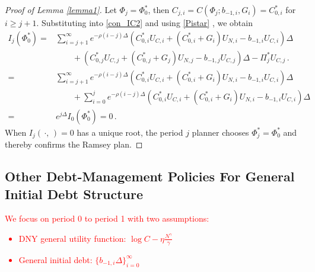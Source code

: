 \documentclass[12pt]{article}
\newcommand{\WJ}[1]{{\textcolor{red}{#1}}}
\begin{document}
\begin{proof}[Proof of Lemma \ref{lemma1}]
Let  $\Phi_j = \Phi_0^*$,  then $C_{j, i}=C(\Phi_j; b_{-1, i}, G_{i})=C_{0, i}^*$ for $i\geq j+1$. Substituting into \eqref{con_IC2} and using \eqref{Pistar} , we obtain
\begin{align*}
I_j(\Phi_0^*) 
=&   \sum_{i=j+1}^{\infty} e^{-\rho(i-j) \Delta} \left(  C_{0, i}^*U_{C, i} + (C_{0, i}^*+G_{i})U_{N, i} -b_{-1, i} U_{C, i} \right) \Delta \nonumber \\
& \quad\quad + \left (C_{0, j}^*U_{C, j} + (C_{0, j}^*+G_{j})U_{N, j} - b_{-1,j} U_{C, j} \right)\Delta -\Pi_{{j}}^*U_{C, j} \,.\\
= & \sum_{i=j+1}^{\infty} e^{-\rho(i-j) \Delta} \left(  C_{0, i}^*U_{C, i} + (C_{0, i}^*+G_{i})U_{N, i} -b_{-1, i} U_{C, i} \right) \Delta \nonumber \\
& \quad\quad + \sum_{i=0}^{j} e^{-\rho(i-j)\Delta}\left(  C_{0, i}^*U_{C, i} + (C_{0, i}^*+G_{i})U_{N, i} -b_{-1, i} U_{C, i} \right) \Delta \\
= & e^{j\Delta } I_0(\Phi_0^*) =0\,.
\end{align*}
When $I_j(\, \cdot, \,)=0$ has a unique root, the period $j$ planner  chooses $\Phi_j^*=\Phi_0^*$ and thereby confirms the Ramsey plan.
\end{proof}



\subsection{Other Debt-Management Policies For General Initial Debt Structure}\label{appsec:otherpolicies}

\WJ{We focus on period 0 to period 1 with two assumptions:
\begin{itemize}
\item DNY general utility function: $\log C - \eta \frac{N^\gamma}{\gamma}$
\item General initial debt: $\{ b_{-1, i}\Delta \}_{i=0}^\infty$
\end{itemize}
}

\end{document}
